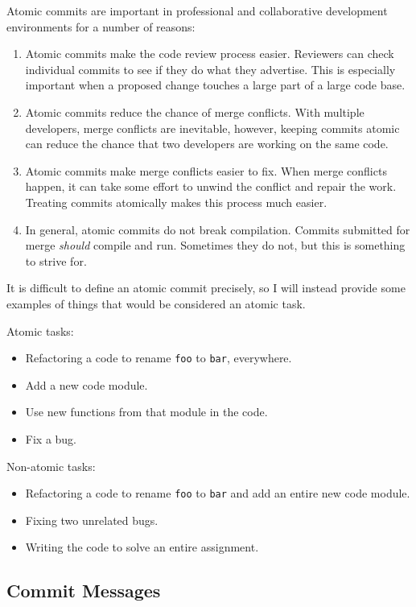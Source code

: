 Atomic commits are important in professional and collaborative development environments for a number of reasons:
\begin{enumerate}
    \item Atomic commits make the code review process easier.  Reviewers can check individual commits to see if they do what they advertise.  This is especially important when a proposed change touches a large part of a large code base.
    \item Atomic commits reduce the chance of merge conflicts.  With multiple developers, merge conflicts are inevitable, however, keeping commits atomic can reduce the chance that two developers are working on the same code.
    \item Atomic commits make merge conflicts easier to fix.  When merge conflicts happen, it can take some effort to unwind the conflict and repair the work.  Treating commits atomically makes this process much easier.
    \item In general, atomic commits do not break compilation.  Commits submitted for merge \textit{should} compile and run.  Sometimes they do not, but this is something to strive for.
\end{enumerate}

It is difficult to define an atomic commit precisely, so I will instead provide some examples of things that would be considered an atomic task.

Atomic tasks:
\begin{itemize}
    \item Refactoring a code to rename \texttt{foo} to \texttt{bar}, everywhere.
    \item Add a new code module.
    \item Use new functions from that module in the code.
    \item Fix a bug.
\end{itemize}

Non-atomic tasks:
\begin{itemize}
    \item Refactoring a code to rename \texttt{foo} to \texttt{bar} and add an entire new code module.
    \item Fixing two unrelated bugs.
    \item Writing the code to solve an entire assignment.
\end{itemize}

\pagebreak

\subsection{Commit Messages}

